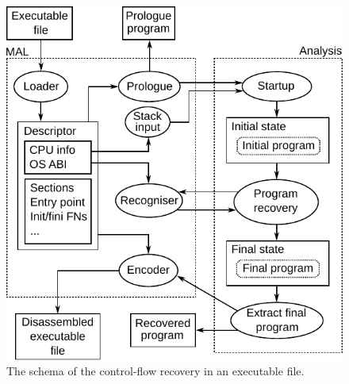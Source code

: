 \documentclass[10pt,twocolumn]{article}
\begin{document}
\begin{figure}[!ht]
\begin{center}
\includegraphics{./fig_schema}
\end{center}
\caption{The schema of the control-flow recovery in an executable file.}
\label{fig:schema}
\end{figure}
\end{document}

